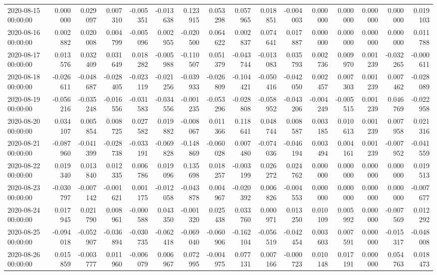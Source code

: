 \begin{tabular}{lrrrrrrrrrrrrrrr}
2020-08-15 00:00:00 & 0.000000 & 0.029097 & 0.007310 & -0.005351 & -0.013638 & 0.123915 & 0.053298 & 0.057965 & 0.018851 & -0.004003 & 0.000000 & 0.000000 & 0.000000 & 0.000000 & 0.019103 \\
2020-08-16 00:00:00 & 0.002882 & 0.020008 & 0.004799 & -0.005096 & 0.002955 & -0.020500 & 0.064622 & 0.002837 & 0.074641 & 0.017887 & 0.000000 & 0.000000 & 0.000000 & 0.000000 & 0.011788 \\
2020-08-17 00:00:00 & 0.013576 & 0.032409 & 0.031649 & 0.018282 & -0.005988 & -0.110507 & 0.051379 & -0.043744 & -0.013083 & 0.035793 & 0.002736 & 0.009970 & 0.001239 & -0.032265 & -0.000611 \\
2020-08-18 00:00:00 & -0.026611 & -0.048687 & -0.028405 & -0.023119 & -0.021256 & -0.039933 & -0.026809 & -0.104421 & -0.050416 & -0.042050 & 0.002457 & 0.007303 & 0.001239 & 0.007462 & -0.028089 \\
2020-08-19 00:00:00 & -0.056216 & -0.035248 & -0.016556 & -0.031583 & -0.034556 & -0.001235 & -0.053296 & -0.028808 & -0.058952 & -0.043206 & -0.004249 & -0.005515 & 0.001239 & 0.046769 & -0.022958 \\
2020-08-20 00:00:00 & 0.034107 & 0.005854 & 0.008725 & 0.027582 & 0.019882 & -0.008067 & 0.011366 & 0.118641 & 0.048744 & 0.008587 & 0.003185 & 0.010613 & 0.001239 & 0.007958 & 0.021316 \\
2020-08-21 00:00:00 & -0.087960 & -0.041399 & -0.028738 & -0.033191 & -0.069828 & -0.148869 & -0.060028 & 0.007480 & -0.074036 & -0.046194 & 0.003494 & 0.004161 & 0.001239 & -0.007952 & -0.041559 \\
2020-08-22 00:00:00 & 0.019340 & 0.013840 & 0.012335 & 0.006786 & 0.019096 & 0.135698 & 0.018257 & -0.003199 & 0.026272 & 0.024762 & 0.000000 & 0.000000 & 0.000000 & 0.000000 & 0.019513 \\
2020-08-23 00:00:00 & -0.030797 & -0.007142 & -0.001621 & 0.001175 & -0.012058 & -0.043878 & 0.004967 & -0.020392 & 0.006826 & -0.004553 & 0.000000 & 0.000000 & 0.000000 & 0.000000 & -0.007677 \\
2020-08-24 00:00:00 & 0.017945 & 0.021790 & 0.008961 & -0.000588 & 0.043350 & -0.001320 & 0.025438 & 0.033760 & 0.000971 & 0.013250 & 0.010109 & 0.005992 & 0.000000 & -0.007569 & 0.012292 \\
2020-08-25 00:00:00 & -0.094018 & -0.052907 & -0.036894 & -0.030735 & -0.062418 & -0.069040 & -0.060906 & -0.162104 & -0.056519 & -0.042454 & 0.003603 & 0.007591 & 0.000000 & -0.015317 & -0.048008 \\
2020-08-26 00:00:00 & 0.015859 & -0.003777 & 0.011960 & -0.006079 & 0.006967 & 0.072995 & -0.004975 & 0.077131 & 0.007166 & -0.000723 & 0.010148 & 0.017191 & 0.000000 & 0.054763 & 0.018473 \\

\end{tabular}
